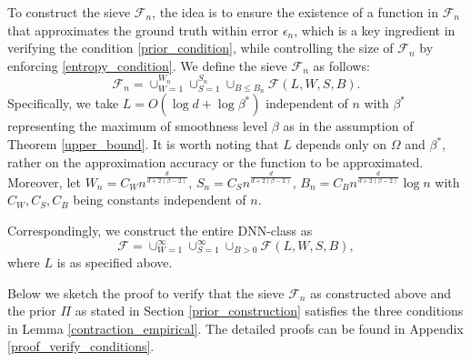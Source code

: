 \documentclass{article}
\newcommand{\F}{\mathcal{F}}
\theoremstyle{plain}
\theoremstyle{definition}
\theoremstyle{remark}
\begin{document}
To construct the sieve $\F_n$, the idea is to ensure the existence of a function in $\F_n$ that approximates the ground truth within error $\epsilon_n$, which is a key ingredient in verifying the condition \eqref{prior_condition}, while controlling the size of $\F_n$ by enforcing \eqref{entropy_condition}. 
We define the sieve $\F_n$ as follows: 
\begin{equation} \label{sieve}
    \F_n = \cup_{W = 1}^{W_n} \cup_{S = 1}^{S_n} \cup_{B \leq B_n} \F(L, W, S, B).
\end{equation}
Specifically, we take $L = O(\log d + \log \beta^\ast)$ independent of $n$ with $\beta^\ast$ representing the maximum of smoothness level $\beta$ as in the assumption of Theorem \ref{upper_bound}. It is worth noting that $L$ depends only on $\Omega$ and $\beta^\ast$, rather on the approximation accuracy or the function to be approximated.  Moreover, let $W_n = C_W n^{\frac{d}{d + 2(\beta-2)}}$, $S_n = C_S n^{\frac{d}{d + 2(\beta-2)}}$, $B_n = C_B n^{\frac{d}{d + 2(\beta-2)}} \log n $ with $C_W, C_S, C_B$ being constants independent of $n$.  

Correspondingly, we construct the entire DNN-class as 
\begin{equation*}
    \F = \cup_{W = 1}^{\infty} \cup_{S = 1}^{\infty} \cup_{B > 0} \F(L, W, S, B),
\end{equation*} 
where $L$ is as specified above. 

Below we sketch the proof to verify that the sieve $\F_n$ as constructed above and the prior $\Pi$ as stated in Section \ref{prior_construction} satisfies the three conditions in Lemma \ref{contraction_empirical}. The detailed proofs can be found in Appendix \ref{proof_verify_conditions}. 
\end{document}
